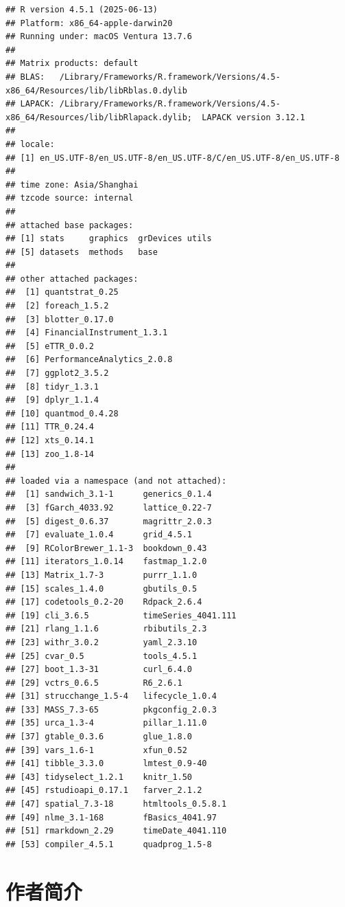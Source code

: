 \documentclass[]{ctexbook}
\begin{document}
\begin{verbatim}
## R version 4.5.1 (2025-06-13)
## Platform: x86_64-apple-darwin20
## Running under: macOS Ventura 13.7.6
## 
## Matrix products: default
## BLAS:   /Library/Frameworks/R.framework/Versions/4.5-x86_64/Resources/lib/libRblas.0.dylib 
## LAPACK: /Library/Frameworks/R.framework/Versions/4.5-x86_64/Resources/lib/libRlapack.dylib;  LAPACK version 3.12.1
## 
## locale:
## [1] en_US.UTF-8/en_US.UTF-8/en_US.UTF-8/C/en_US.UTF-8/en_US.UTF-8
## 
## time zone: Asia/Shanghai
## tzcode source: internal
## 
## attached base packages:
## [1] stats     graphics  grDevices utils    
## [5] datasets  methods   base     
## 
## other attached packages:
##  [1] quantstrat_0.25           
##  [2] foreach_1.5.2             
##  [3] blotter_0.17.0            
##  [4] FinancialInstrument_1.3.1 
##  [5] eTTR_0.0.2                
##  [6] PerformanceAnalytics_2.0.8
##  [7] ggplot2_3.5.2             
##  [8] tidyr_1.3.1               
##  [9] dplyr_1.1.4               
## [10] quantmod_0.4.28           
## [11] TTR_0.24.4                
## [12] xts_0.14.1                
## [13] zoo_1.8-14                
## 
## loaded via a namespace (and not attached):
##  [1] sandwich_3.1-1      generics_0.1.4     
##  [3] fGarch_4033.92      lattice_0.22-7     
##  [5] digest_0.6.37       magrittr_2.0.3     
##  [7] evaluate_1.0.4      grid_4.5.1         
##  [9] RColorBrewer_1.1-3  bookdown_0.43      
## [11] iterators_1.0.14    fastmap_1.2.0      
## [13] Matrix_1.7-3        purrr_1.1.0        
## [15] scales_1.4.0        gbutils_0.5        
## [17] codetools_0.2-20    Rdpack_2.6.4       
## [19] cli_3.6.5           timeSeries_4041.111
## [21] rlang_1.1.6         rbibutils_2.3      
## [23] withr_3.0.2         yaml_2.3.10        
## [25] cvar_0.5            tools_4.5.1        
## [27] boot_1.3-31         curl_6.4.0         
## [29] vctrs_0.6.5         R6_2.6.1           
## [31] strucchange_1.5-4   lifecycle_1.0.4    
## [33] MASS_7.3-65         pkgconfig_2.0.3    
## [35] urca_1.3-4          pillar_1.11.0      
## [37] gtable_0.3.6        glue_1.8.0         
## [39] vars_1.6-1          xfun_0.52          
## [41] tibble_3.3.0        lmtest_0.9-40      
## [43] tidyselect_1.2.1    knitr_1.50         
## [45] rstudioapi_0.17.1   farver_2.1.2       
## [47] spatial_7.3-18      htmltools_0.5.8.1  
## [49] nlme_3.1-168        fBasics_4041.97    
## [51] rmarkdown_2.29      timeDate_4041.110  
## [53] compiler_4.5.1      quadprog_1.5-8
\end{verbatim}

\chapter*{作者简介}\label{author}
\end{document}
